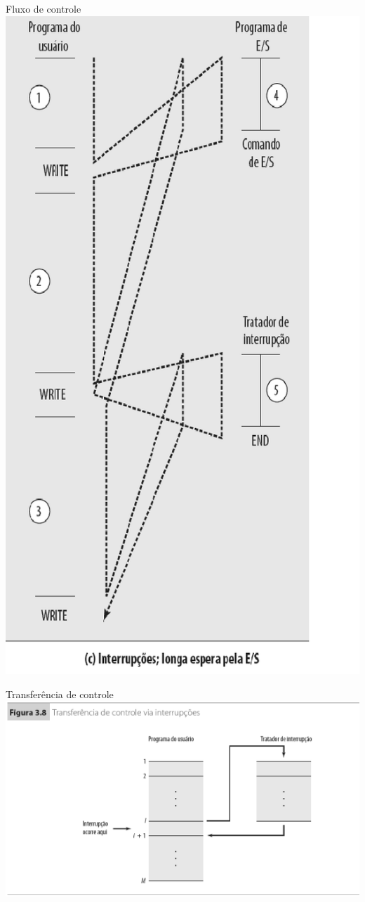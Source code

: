 \begin{slide}{Fluxo de controle}
   \includegraphics[height=0.8\textheight]{figs/int03.eps}
\end{slide}

\begin{slide}{Transferência de controle}
   \centering
   \includegraphics[height=0.75\textheight]{figs/int_transf.eps}
\end{slide}

